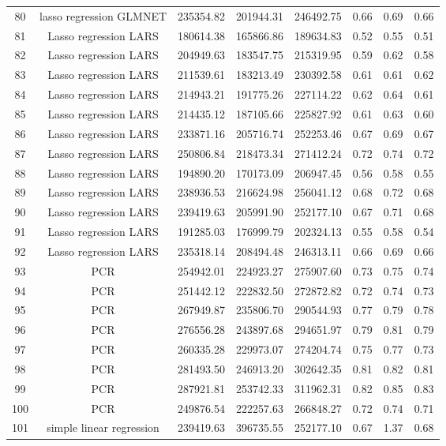 \begin{tabular}{cccccccc}
  80 & lasso regression GLMNET & 235354.82 & 201944.31 & 246492.75 & 0.66 & 0.69 & 0.66 \\ 
  81 & Lasso regression LARS & 180614.38 & 165866.86 & 189634.83 & 0.52 & 0.55 & 0.51 \\ 
  82 & Lasso regression LARS & 204949.63 & 183547.75 & 215319.95 & 0.59 & 0.62 & 0.58 \\ 
  83 & Lasso regression LARS & 211539.61 & 183213.49 & 230392.58 & 0.61 & 0.61 & 0.62 \\ 
  84 & Lasso regression LARS & 214943.21 & 191775.26 & 227114.22 & 0.62 & 0.64 & 0.61 \\ 
  85 & Lasso regression LARS & 214435.12 & 187105.66 & 225827.92 & 0.61 & 0.63 & 0.60 \\ 
  86 & Lasso regression LARS & 233871.16 & 205716.74 & 252253.46 & 0.67 & 0.69 & 0.67 \\ 
  87 & Lasso regression LARS & 250806.84 & 218473.34 & 271412.24 & 0.72 & 0.74 & 0.72 \\ 
  88 & Lasso regression LARS & 194890.20 & 170173.09 & 206947.45 & 0.56 & 0.58 & 0.55 \\ 
  89 & Lasso regression LARS & 238936.53 & 216624.98 & 256041.12 & 0.68 & 0.72 & 0.68 \\ 
  90 & Lasso regression LARS & 239419.63 & 205991.90 & 252177.10 & 0.67 & 0.71 & 0.68 \\ 
  91 & Lasso regression LARS & 191285.03 & 176999.79 & 202324.13 & 0.55 & 0.58 & 0.54 \\ 
  92 & Lasso regression LARS & 235318.14 & 208494.48 & 246313.11 & 0.66 & 0.69 & 0.66 \\ 
  93 & PCR & 254942.01 & 224923.27 & 275907.60 & 0.73 & 0.75 & 0.74 \\ 
  94 & PCR & 251442.12 & 222832.50 & 272872.82 & 0.72 & 0.74 & 0.73 \\ 
  95 & PCR & 267949.87 & 235806.70 & 290544.93 & 0.77 & 0.79 & 0.78 \\ 
  96 & PCR & 276556.28 & 243897.68 & 294651.97 & 0.79 & 0.81 & 0.79 \\ 
  97 & PCR & 260335.28 & 229973.07 & 274204.74 & 0.75 & 0.77 & 0.73 \\ 
  98 & PCR & 281493.50 & 246913.20 & 302642.35 & 0.81 & 0.82 & 0.81 \\ 
  99 & PCR & 287921.81 & 253742.33 & 311962.31 & 0.82 & 0.85 & 0.83 \\ 
  100 & PCR & 249876.54 & 222257.63 & 266848.27 & 0.72 & 0.74 & 0.71 \\ 
  101 & simple linear regression & 239419.63 & 396735.55 & 252177.10 & 0.67 & 1.37 & 0.68 \\ 

\end{tabular}
